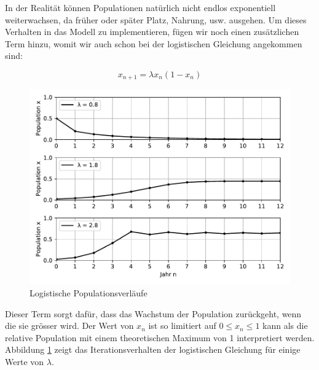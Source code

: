 In der Realität können Populationen natürlich nicht endlos
exponentiell weiterwachsen, 
da früher oder später Platz, Nahrung, usw. ausgehen.
Um dieses Verhalten in das Modell zu implementieren,
fügen wir noch einen zusätzlichen Term hinzu, 
womit wir auch schon bei der logistischen Gleichung
angekommen sind:

\begin{equation}
    x_{n+1} = \lambda x_{n} (1 - x_{n})
\end{equation}

\begin{figure}
    \includegraphics[width=\linewidth]{papers/logistic/figures/pop_logistic.pdf}
    \caption{Logistische Populationsverläufe}
    \label{fig:pop_logistic}
\end{figure}

Dieser Term sorgt dafür, 
dass das Wachstum der Population zurückgeht, 
wenn die sie grösser wird.
Der Wert von $x_n$ ist so limitiert auf 
$0 \le x_n \le 1$  
kann als die relative Population mit einem
theoretischen Maximum von 1 interpretiert werden. 
Abbildung \ref{fig:pop_logistic} zeigt das Iterationsverhalten 
der logistischen Gleichung für einige Werte von $\lambda$.




